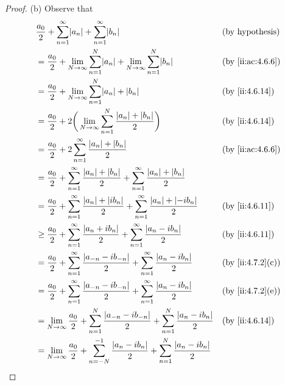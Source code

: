 \begin{proof}{(b)}
  Observe that
  \begin{align*}
     & \dfrac{a_0}{2} + \sum_{n = 1}^\infty \abs{a_n} + \sum_{n = 1}^\infty \abs{b_n}                                                               &  & \text{(by hypothesis)} \\
     & = \dfrac{a_0}{2} + \lim_{N \to \infty} \sum_{n = 1}^N \abs{a_n} + \lim_{N \to \infty} \sum_{n = 1}^N \abs{b_n}                               &  & \by{ii:ac:4.6.6}       \\
     & = \dfrac{a_0}{2} + \lim_{N \to \infty} \sum_{n = 1}^N \abs{a_n} + \abs{b_n}                                                                  &  & \by{ii:4.6.14}         \\
     & = \dfrac{a_0}{2} + 2 \bigg(\lim_{N \to \infty} \sum_{n = 1}^N \dfrac{\abs{a_n} + \abs{b_n}}{2}\bigg)                                         &  & \by{ii:4.6.14}         \\
     & = \dfrac{a_0}{2} + 2 \sum_{n = 1}^\infty \dfrac{\abs{a_n} + \abs{b_n}}{2}                                                                    &  & \by{ii:ac:4.6.6}       \\
     & = \dfrac{a_0}{2} + \sum_{n = 1}^\infty \dfrac{\abs{a_n} + \abs{b_n}}{2} + \sum_{n = 1}^\infty \dfrac{\abs{a_n} + \abs{b_n}}{2}                                           \\
     & = \dfrac{a_0}{2} + \sum_{n = 1}^\infty \dfrac{\abs{a_n} + \abs{i b_n}}{2} + \sum_{n = 1}^\infty \dfrac{\abs{a_n} + \abs{-i b_n}}{2}          &  & \by{ii:4.6.11}         \\
     & \geq \dfrac{a_0}{2} + \sum_{n = 1}^\infty \dfrac{\abs{a_n + i b_n}}{2} + \sum_{n = 1}^\infty \dfrac{\abs{a_n - i b_n}}{2}                    &  & \by{ii:4.6.11}         \\
     & = \dfrac{a_0}{2} + \sum_{n = 1}^\infty \dfrac{\abs{a_{-n} - i b_{-n}}}{2} + \sum_{n = 1}^\infty \dfrac{\abs{a_n - i b_n}}{2}                 &  & \by{ii:4.7.2}[c]       \\
     & = \dfrac{a_0}{2} + \sum_{n = 1}^\infty \dfrac{\abs{a_{-n} - i b_{-n}}}{2} + \sum_{n = 1}^\infty \dfrac{\abs{a_n - i b_n}}{2}                 &  & \by{ii:4.7.2}[e]       \\
     & = \lim_{N \to \infty} \dfrac{a_0}{2} + \sum_{n = 1}^N \dfrac{\abs{a_{-n} - i b_{-n}}}{2} + \sum_{n = 1}^N \dfrac{\abs{a_n - i b_n}}{2}       &  & \by{ii:4.6.14}         \\
     & = \lim_{N \to \infty} \dfrac{a_0}{2} + \sum_{n = -N}^{-1} \dfrac{\abs{a_n - i b_n}}{2} + \sum_{n = 1}^N \dfrac{\abs{a_n - i b_n}}{2}                                     \\

\end{align*}
\end{proof}
